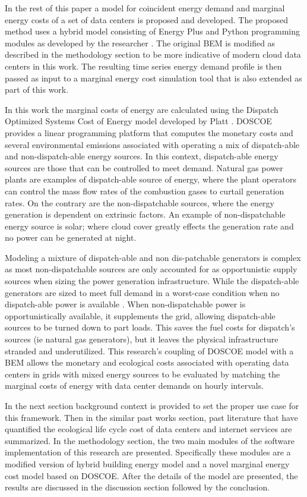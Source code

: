 \documentclass[twocolumn, a4paper,10pt]{article}
\begin{document}
In the rest of this paper a model for coincident energy demand and marginal energy costs of a set of data centers is proposed and developed. The proposed method uses a hybrid model consisting of Energy Plus and Python programming modules as developed by the researcher \citep{kumar20}. The original BEM is modified as described in the methodology section to be more indicative of modern cloud data centers in this work. The resulting time series energy demand profile is then passed as input to a marginal energy cost simulation tool that is also extended as part of this work.

In this work the marginal costs of energy are calculated using the Dispatch Optimized Systems Cost of Energy model developed by Platt \citep{platt17}. DOSCOE provides a linear programming platform that computes the monetary costs and several environmental emissions associated with operating a mix of dispatch-able and non-dispatch-able energy sources. In this context, dispatch-able energy sources are those that can be controlled to meet demand. Natural gas power plants are examples of dispatch-able source of energy, where the plant operators can control the mass flow rates of the combustion gases to curtail generation rates. On the contrary are the non-dispatchable sources, where the energy generation is dependent on extrinsic factors. An example of non-dispatchable energy source is solar; where cloud cover greatly effects the generation rate and no power can be generated at night.

Modeling a mixture of dispatch-able and non dis-patchable generators is complex as most non-dispatchable sources are only accounted for as opportunistic supply sources when sizing the power generation infrastructure. While the dispatch-able generators are sized to meet full demand in a worst-case condition when no dispatch-able power is available \citep{platt17}. When non-dispatchable power is opportunistically available, it supplements the grid, allowing dispatch-able sources to be turned down to part loads. This saves the fuel costs for dispatch's sources (ie natural gas generators), but it leaves the physical infrastructure stranded and underutilized. This research’s coupling of DOSCOE model with a BEM allows the monetary and ecological costs associated with operating data centers in grids with mixed energy sources to be evaluated by matching the marginal costs of energy with data center demands on hourly intervals.

In the next section background context is provided to set the proper use case for this framework. Then in the similar past works section, past literature that have quantified the ecological life cycle cost of data centers and internet services are summarized. In the methodology section, the two main modules of the software implementation of this research are presented. Specifically these modules are a modified version of hybrid building energy model and a novel marginal energy cost model based on DOSCOE. After the details of the model are presented, the results are discussed in the discussion section followed by the conclusion.
\end{document}
